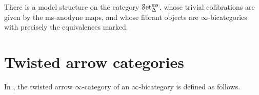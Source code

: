 \documentclass[main.tex]{subfiles}
\begin{document}
\begin{theorem}
  There is a model structure on the category $\mathcal{S}\mathrm{et}_{\Delta}^{\mathrm{ms}}$, whose trivial cofibrations are given by the ms-anodyne maps, and whose fibrant objects are $\infty$-bicategories with precisely the equivalences marked.
\end{theorem}

\section{Twisted arrow categories}
\label{sec:twisted_arrow_categories}

In \cite{garcia2020enhanced}, the twisted arrow $\infty$-category of an $\infty$-bicategory is defined as follows.
\end{document}
